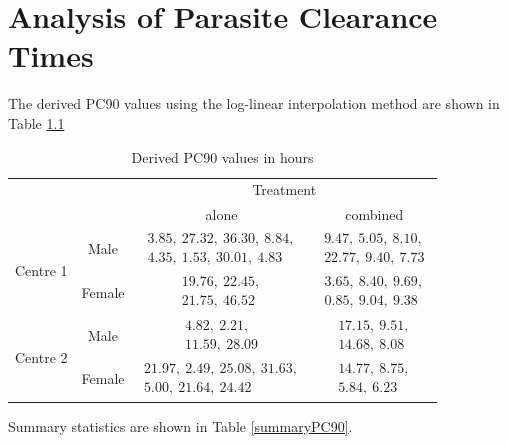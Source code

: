 \chapter{Analysis of Parasite Clearance Times}\label{ch:analysis}
The derived PC90 values using the log-linear interpolation method are shown in Table \ref{derivedPC90}
\begin{table}[h]
\centering
\caption{Derived PC90 values in hours}\label{derivedPC90}
\begin{tabular}{|cc|c|c|}
\hline
&&\multicolumn{2}{c|}{Treatment}\\
&&alone&combined\\\hline
\multirow{2}{*}{Centre 1}&Male&$\begin{array}{c}3.85,\ 27.32,\ 36.30,\  8.84,\\4.35,\  1.53,\ 30.01,\  4.83\end{array}$&$\begin{array}{c}9.47,\  5.05,\  8.10,\\22.77,\  9.40,\  7.73\end{array}$\\\cline{2-4}
&Female&$\begin{array}{c}19.76,\ 22.45,\\21.75,\ 46.52\end{array}$&$\begin{array}{c}3.65,\ 8.40 ,\ 9.69,\\0.85,\ 9.04,\ 9.38\end{array}$\\\hline
\multirow{2}{*}{Centre 2}&Male&$\begin{array}{c}4.82,\ 2.21,\\11.59,\ 28.09\end{array}$&$\begin{array}{c}17.15,\ 9.51,\\14.68,\ 8.08\end{array}$\\\cline{2-4}
&Female&$\begin{array}{c}21.97,\ 2.49,\ 25.08,\ 31.63,\\5.00,\ 21.64,\ 24.42\end{array}$&$\begin{array}{c}14.77,\  8.75,\\5.84,\ 6.23\end{array}$\\\hline
\end{tabular}
\end{table}
Summary statistics are shown in Table \ref{summaryPC90}.
